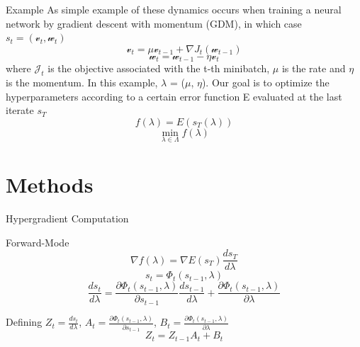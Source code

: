 \documentclass{beamer}
\begin{document}
\begin{frame}{}
    \begin{block}{Example}
        As simple example of these dynamics occurs when training a neural network by gradient descent with momentum (GDM), in which case $s_{t} = ( \mathcal{v}_{t}, \mathcal{w}_{t} )$
        \begin{equation}
            \mathcal{v}_{t} = \mu\mathcal{v}_{t-1} + \nabla J_{t}(\mathcal{w}_{t-1})
        \end{equation}
        \begin{equation}
            \mathcal{w}_{t} = \mathcal{w}_{t-1} - \eta\mathcal{v}_{t}
        \end{equation}
        where $\mathcal{J}_{t}$ is the objective associated with the t-th minibatch, $\mu$ is the rate and $\eta$ is the momentum. In this example, $\lambda$ = ($\mu$, $\eta$).
        Our goal is to optimize the hyperparameters according to a certain error function E
        evaluated at the last iterate $s_{T}$
        \begin{equation}
            f(\lambda) = E(s_{T}(\lambda))
        \end{equation}
        \begin{equation}
            \min_{\lambda \in \Lambda} f(\lambda)
        \end{equation}
    \end{block}
\end{frame}

\section{Methods}
\begin{frame}{Hypergradient Computation}
    \begin{block}{Forward-Mode}
        \begin{equation}
            \nabla f(\lambda) = \nabla E(s_{T})\frac{ds_{T}}{d\lambda}
        \end{equation}
        \begin{equation}
            s_{t} = \Phi_{t}(s_{t-1}, \lambda)
        \end{equation}
        \begin{equation}
            \frac{ds_{t}}{d\lambda} = \frac{\partial \Phi_{t}(s_{t-1}, \lambda)}{\partial s_{t-1}} \frac{ds_{t-1}}{d\lambda} + \frac{\partial \Phi_{t}(s_{t-1}, \lambda)}{\partial \lambda}
        \end{equation}
    \end{block}
    \begin{block}{}
        Defining $Z_{t} = \frac{ds_{t}}{d\lambda}$, 
        $A_{t} = \frac{\partial \Phi_{t}(s_{t-1}, \lambda)}{\partial s_{t-1}}$,
        $B_{t} = \frac{\partial \Phi_{t}(s_{t-1}, \lambda)}{\partial \lambda}$
        \begin{equation}
            Z_{t} = Z_{t-1}A_{t}+B_{t}
        \end{equation}
    \end{block}
\end{frame}
\end{document}
